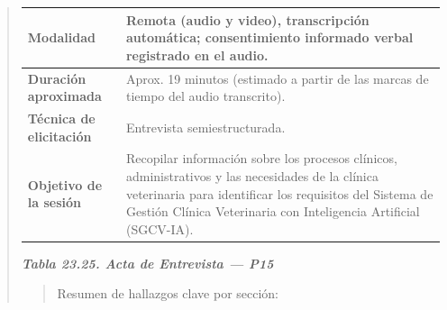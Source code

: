 \documentclass[
]{article}
\begin{document}
\begin{quote}
{\begin{longtable}[]{|
  >{\raggedright\arraybackslash}p{}|
  >{\raggedright\arraybackslash}p{}|}
\hline
\textbf{Modalidad} & \begin{minipage}[t]{\linewidth}\raggedright
Remota (audio y video), transcripción automática; consentimiento informado verbal registrado en el audio.
\end{minipage} \\
\hline
\textbf{Duración aproximada} & \begin{minipage}[t]{\linewidth}\raggedright
Aprox. 19 minutos (estimado a partir de las marcas de tiempo del audio transcrito).
\end{minipage} \\
\hline
\textbf{Técnica de elicitación} & \begin{minipage}[t]{\linewidth}\raggedright
Entrevista semiestructurada.
\end{minipage} \\
\hline
\textbf{Objetivo de la sesión} & \begin{minipage}[t]{\linewidth}\raggedright
Recopilar información sobre los procesos clínicos, administrativos y las necesidades de la clínica veterinaria para identificar los requisitos del Sistema de Gestión Clínica Veterinaria con Inteligencia Artificial (SGCV-IA).
\end{minipage} \\
\hline
\end{longtable}
}

\protect{}\label{_bookmark_P15_acta}{}\emph{\textbf{Tabla 23.25. Acta de Entrevista --- P15}}

\begin{quote}
Resumen de hallazgos clave por sección:
\end{quote}


\end{quote}
\end{document}

